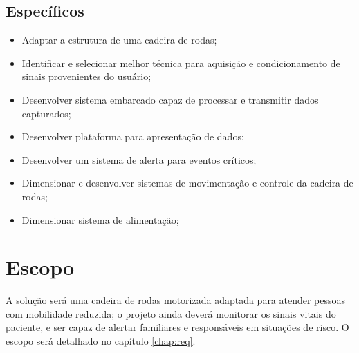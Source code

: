 \subsection{Específicos}

\begin{itemize}
\item Adaptar a estrutura de uma cadeira de rodas;
\item Identificar e selecionar melhor técnica para aquisição e condicionamento de sinais provenientes do usuário;
\item Desenvolver sistema embarcado capaz de processar e transmitir dados capturados;
\item Desenvolver plataforma para apresentação de dados;
\item Desenvolver um sistema de alerta para eventos críticos;
\item Dimensionar e desenvolver sistemas de movimentação e controle da cadeira de rodas;
\item Dimensionar sistema de alimentação;
\end{itemize}

\section{Escopo}

A solução será uma cadeira de rodas motorizada adaptada para atender pessoas
com mobilidade reduzida; o projeto ainda deverá monitorar os sinais vitais
do paciente, e ser capaz de alertar familiares e responsáveis em
situações de risco. O escopo será detalhado no capítulo \ref{chap:req}.


